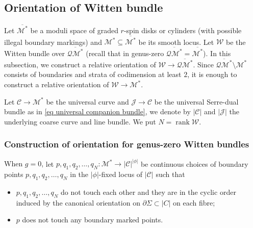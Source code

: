 \documentclass[11pt,a4paper]{article}
\theoremstyle{definition}
\theoremstyle{remark}
\numberwithin{equation}{section}
\def\Mbarstar{{\overline{\mathcal M^*}}}
\begin{document}
  

\subsection{Orientation of Witten bundle}
Let $\Mbarstar$ be a moduli space of graded $r$-spin disks {or cylinders} (with possible illegal boundary markings) and $\mathcal M^*\subseteq \Mbarstar$ be its smooth locus. Let $\mathcal W$ be the Witten bundle over $\overline{\mathcal{QM}^*}$ (recall that in genus-zero $\overline{\mathcal{QM}^*}=\Mbarstar$). In this subsection, we construct a relative orientation of $\mathcal W \to \overline{\mathcal{QM}^*}$. Since $\overline{\mathcal{QM}^*} \setminus \mathcal M^*$ consists of boundaries and strata of codimension at least $2$, it is enough to construct a relative orientation of $\mathcal W \to \mathcal M^*$.

Let $\mathcal C\to \mathcal M^*$ be the universal curve and $\mathcal J\to \mathcal C$ be the universal Serre-dual bundle as in \eqref{eq universal companion bundle}, we denote by $\lvert \mathcal C \rvert$ and $\lvert \mathcal J \rvert$ the underlying coarse curve and line bundle. We put $N=\operatorname{rank} \mathcal W$.

\subsubsection{Construction of orientation for genus-zero Witten bundles}

{When $g=0$,} let $p,q_1,q_2,\dots,q_N\colon \mathcal M^*\to \lvert \mathcal C \rvert^{\lvert \phi\rvert}$ be continuous choices of boundary points $p,q_1,q_2,\dots,q_N$ in the $\lvert \phi\rvert$-fixed locus of $\lvert \mathcal C \rvert$  such that 
\begin{itemize}
    \item $p,q_1,q_2,\dots,q_N$ do not touch each other and they are in the cyclic order induced by the canonical orientation on $\partial \Sigma\subset \lvert C\rvert$ on each fibre;
    \item $p$ does not touch any boundary marked points.
\end{itemize}

 
\end{document}
